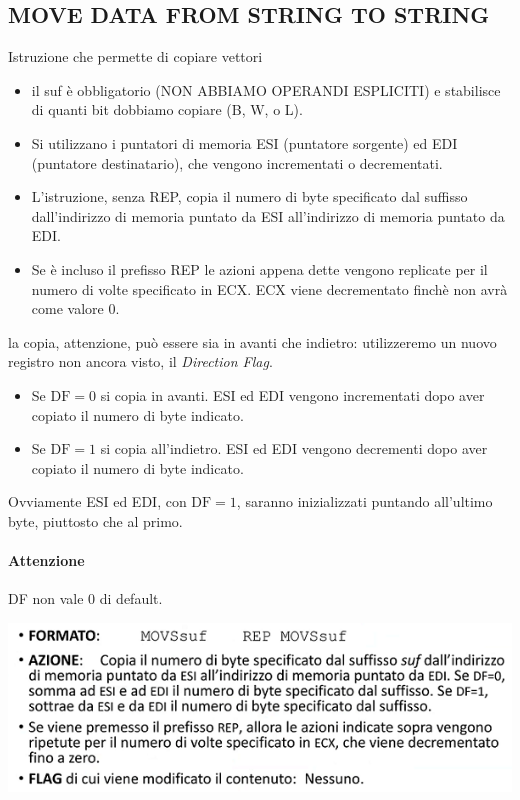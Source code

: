 \documentclass[11pt]{report}
\begin{document}
\subsection{MOVE DATA FROM STRING TO STRING}
Istruzione che permette di copiare vettori
\begin{itemize}
\item il suf è obbligatorio (NON ABBIAMO OPERANDI ESPLICITI) e stabilisce di quanti bit dobbiamo copiare (B, W, o L).
\item Si utilizzano i puntatori di memoria ESI (puntatore sorgente) ed EDI (puntatore destinatario), che vengono incrementati o decrementati.
\item L'istruzione, senza REP, copia il numero di byte specificato dal suffisso dall'indirizzo di memoria puntato da ESI all'indirizzo di memoria puntato da EDI.
\item Se è incluso il prefisso REP le azioni appena dette vengono replicate per il numero di volte specificato in ECX. ECX viene decrementato finchè non avrà come valore 0.
\end{itemize}
la copia, attenzione, può essere sia in avanti che indietro: utilizzeremo un nuovo registro non ancora visto, il \emph{Direction Flag}.
\begin{itemize}
\item Se $\text{DF}=0$ si copia in avanti. ESI ed EDI vengono incrementati dopo aver copiato il numero di byte indicato.
\item Se $\text{DF}=1$ si copia all'indietro. ESI ed EDI vengono decrementi dopo aver copiato il numero di byte indicato. 
\end{itemize}
Ovviamente ESI ed EDI, con $\text{DF}=1$, saranno inizializzati puntando all'ultimo byte, piuttosto che al primo.
\paragraph{Attenzione} DF non vale 0 di default. 
\begin{center}
\includegraphics{img/58.PNG}
\end{center}
\end{document}
